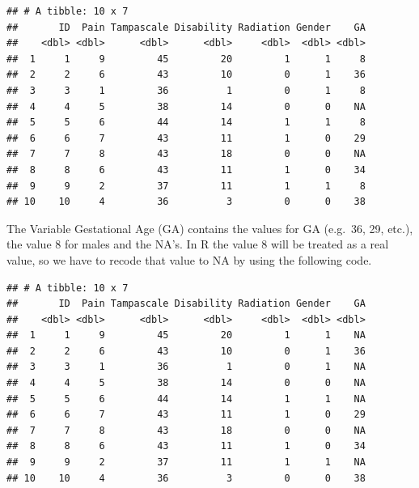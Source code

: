 \documentclass[]{book}
\newenvironment{Shaded}{\begin{snugshade}}{\end{snugshade}}
\newcommand{\KeywordTok}[1]{\textcolor[rgb]{0.13,0.29,0.53}{\textbf{#1}}}
\newcommand{\DecValTok}[1]{\textcolor[rgb]{0.00,0.00,0.81}{#1}}
\newcommand{\StringTok}[1]{\textcolor[rgb]{0.31,0.60,0.02}{#1}}
\newcommand{\OtherTok}[1]{\textcolor[rgb]{0.56,0.35,0.01}{#1}}
\newcommand{\OperatorTok}[1]{\textcolor[rgb]{0.81,0.36,0.00}{\textbf{#1}}}
\newcommand{\NormalTok}[1]{#1}
\theoremstyle{definition}
\theoremstyle{definition}
\theoremstyle{definition}
\theoremstyle{remark}
\begin{document}
\begin{verbatim}
## # A tibble: 10 x 7
##       ID  Pain Tampascale Disability Radiation Gender    GA
##    <dbl> <dbl>      <dbl>      <dbl>     <dbl>  <dbl> <dbl>
##  1     1     9         45         20         1      1     8
##  2     2     6         43         10         0      1    36
##  3     3     1         36          1         0      1     8
##  4     4     5         38         14         0      0    NA
##  5     5     6         44         14         1      1     8
##  6     6     7         43         11         1      0    29
##  7     7     8         43         18         0      0    NA
##  8     8     6         43         11         1      0    34
##  9     9     2         37         11         1      1     8
## 10    10     4         36          3         0      0    38
\end{verbatim}

The Variable Gestational Age (GA) contains the values for GA (e.g.~36,
29, etc.), the value 8 for males and the NA's. In R the value 8 will be
treated as a real value, so we have to recode that value to NA by using
the following code.

\begin{Shaded}
\end{Shaded}

\begin{verbatim}
## # A tibble: 10 x 7
##       ID  Pain Tampascale Disability Radiation Gender    GA
##    <dbl> <dbl>      <dbl>      <dbl>     <dbl>  <dbl> <dbl>
##  1     1     9         45         20         1      1    NA
##  2     2     6         43         10         0      1    36
##  3     3     1         36          1         0      1    NA
##  4     4     5         38         14         0      0    NA
##  5     5     6         44         14         1      1    NA
##  6     6     7         43         11         1      0    29
##  7     7     8         43         18         0      0    NA
##  8     8     6         43         11         1      0    34
##  9     9     2         37         11         1      1    NA
## 10    10     4         36          3         0      0    38
\end{verbatim}
\end{document}
